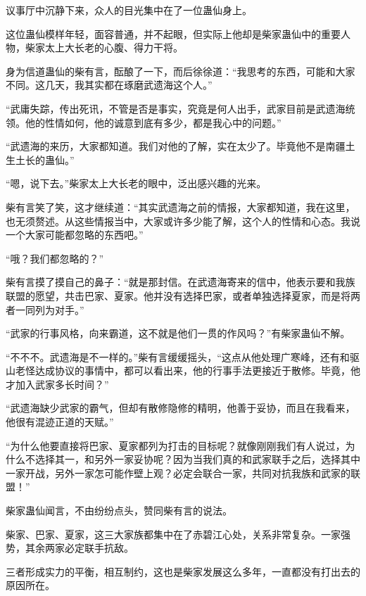 
\begin{this_body}



议事厅中沉静下来，众人的目光集中在了一位蛊仙身上。

这位蛊仙模样年轻，面容普通，并不起眼，但实际上他却是柴家蛊仙中的重要人物，柴家太上大长老的心腹、得力干将。

身为信道蛊仙的柴有言，酝酿了一下，而后徐徐道：“我思考的东西，可能和大家不同。这几天，我其实都在琢磨武遗海这个人。”

“武庸失踪，传出死讯，不管是否是事实，究竟是何人出手，武家目前是武遗海统领。他的性情如何，他的诚意到底有多少，都是我心中的问题。”

“武遗海的来历，大家都知道。我们对他的了解，实在太少了。毕竟他不是南疆土生土长的蛊仙。”

“嗯，说下去。”柴家太上大长老的眼中，泛出感兴趣的光来。

柴有言笑了笑，这才继续道：“其实武遗海之前的情报，大家都知道，我在这里，也无须赘述。从这些情报当中，大家或许多少能了解，这个人的性情和心态。我说一个大家可能都忽略的东西吧。”

“哦？我们都忽略的？”

柴有言摸了摸自己的鼻子：“就是那封信。在武遗海寄来的信中，他表示要和我族联盟的愿望，共击巴家、夏家。他并没有选择巴家，或者单独选择夏家，而是将两者一同列为对手。”

“武家的行事风格，向来霸道，这不就是他们一贯的作风吗？”有柴家蛊仙不解。

“不不不。武遗海是不一样的。”柴有言缓缓摇头，“这点从他处理广寒峰，还有和驱山老怪达成协议的事情中，都可以看出来，他的行事手法更接近于散修。毕竟，他才加入武家多长时间？”

“武遗海缺少武家的霸气，但却有散修隐修的精明，他善于妥协，而且在我看来，他很有混迹正道的天赋。”

“为什么他要直接将巴家、夏家都列为打击的目标呢？就像刚刚我们有人说过，为什么不选择其一，和另外一家妥协呢？因为当我们真的和武家联手之后，选择其中一家开战，另外一家怎可能作壁上观？必定会联合一家，共同对抗我族和武家的联盟！”

柴家蛊仙闻言，不由纷纷点头，赞同柴有言的说法。

柴家、巴家、夏家，这三大家族都集中在了赤碧江心处，关系非常复杂。一家强势，其余两家必定联手抗敌。

三者形成实力的平衡，相互制约，这也是柴家发展这么多年，一直都没有打出去的原因所在。


\end{this_body}
